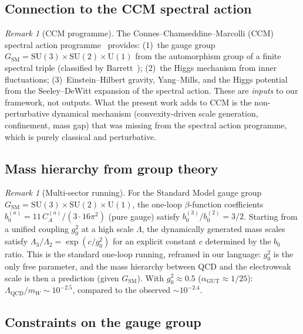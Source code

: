 \documentclass[12pt]{article}
\theoremstyle{definition}
\theoremstyle{remark}
\newtheorem{remark}[theorem]{Remark}
\newcommand{\SU}{\mathrm{SU}}
\newcommand{\U}{\mathrm{U}}
\newcommand{\SM}{\mathrm{SM}}
\begin{document}
\subsection{Connection to the CCM spectral action}
\label{sec:ccm_connection}

\begin{remark}[CCM programme]
\label{rem:ccm}
The Connes--Chamseddine--Marcolli (CCM) spectral action
programme~\cite{CCM2007,CC97,Connes2013} provides:
(1)~the gauge group $G_\SM = \SU(3) \times \SU(2) \times \U(1)$
from the automorphism group of a finite spectral triple (classified
by Barrett~\cite{Barrett2006});
(2)~the Higgs mechanism from inner fluctuations;
(3)~Einstein--Hilbert gravity, Yang--Mills, and the Higgs potential
from the Seeley--DeWitt expansion of the spectral action.
These are \emph{inputs} to our framework, not outputs.  What the
present work adds to CCM is the non-perturbative dynamical mechanism
(convexity-driven scale generation, confinement, mass gap) that was
missing from the spectral action programme, which is purely classical
and perturbative.
\end{remark}

\subsection{Mass hierarchy from group theory}

\begin{remark}[Multi-sector running]
\label{rem:hierarchy}
For the Standard Model gauge group $G_\SM = \SU(3) \times \SU(2)
\times \U(1)$, the one-loop $\beta$-function coefficients $b_0^{(a)}
= 11\,C_A^{(a)}/(3 \cdot 16\pi^2)$ (pure gauge) satisfy
$b_0^{(3)}/b_0^{(2)} = 3/2$.  Starting from a unified coupling
$g^2_0$ at a high scale $\Lambda$, the dynamically generated mass
scales satisfy
$\Lambda_3/\Lambda_2 = \exp(c/g^2_0)$ for an explicit constant $c$
determined by the $b_0$ ratio.  This is the standard one-loop
running, reframed in our language: $g^2_0$ is the only free
parameter, and the mass hierarchy between QCD and the electroweak
scale is then a prediction (given $G_\SM$).  With
$g^2_0 \approx 0.5$ ($\alpha_{\mathrm{GUT}} \approx 1/25$):
$\Lambda_{\mathrm{QCD}}/m_W \sim 10^{-2.5}$, compared to the
observed $\sim 10^{-2.4}$.
\end{remark}

\subsection{Constraints on the gauge group}
\end{document}
